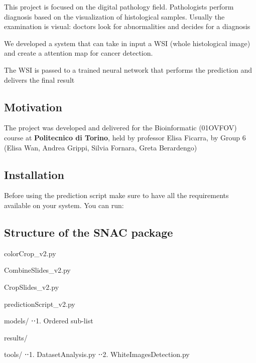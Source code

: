 This project is focused on the digital pathology field. Pathologists perform diagnosis based on the visualization of histological samples. Usually the examination is visual\+: doctors look for abnormalities and decides for a diagnosis

We developed a system that can take in input a W\+SI (whole histological image) and create a attention map for cancer detection.

The W\+SI is passed to a trained neural network that performs the prediction and delivers the final result

\subsection*{Motivation}

The project was developed and delivered for the Bioinformatic (01O\+V\+F\+OV) course at {\bfseries{Politecnico di Torino}}, held by professor Elisa Ficarra, by Group 6 (Elisa Wan, Andrea Grippi, Silvia Fornara, Greta Berardengo)

\subsection*{Installation}

Before using the prediction script make sure to have all the requirements available on your system. You can run\+:


\begin{DoxyCode}{0}
\end{DoxyCode}


\subsection*{Structure of the S\+N\+AC package}


\begin{DoxyEnumerate}
\item color\+Crop\+\_\+v2.\+py
\item Combine\+Slides\+\_\+v2.\+py
\item Crop\+Slides\+\_\+v2.\+py
\item prediction\+Script\+\_\+v2.\+py
\item models/ ⋅⋅1. Ordered sub-\/list
\item results/
\item tools/ ⋅⋅1. Dataset\+Analysis.\+py ⋅⋅2. White\+Images\+Detection.\+py
\end{DoxyEnumerate}

